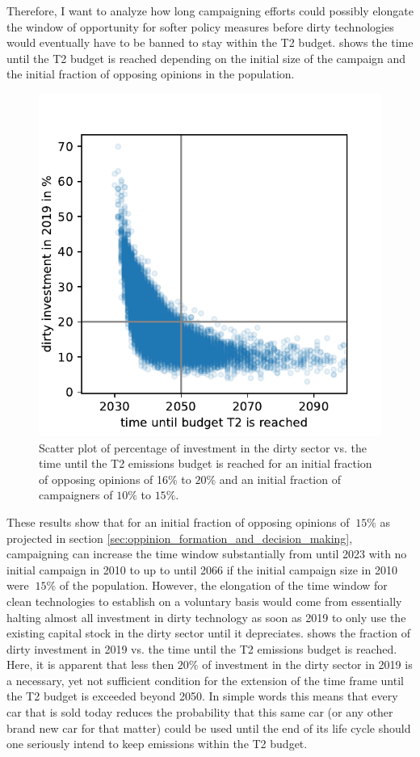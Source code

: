 Therefore, I want to analyze how long campaigning efforts could possibly elongate the window of opportunity for softer policy measures before dirty technologies would eventually have to be banned to stay within the T2 budget.  shows the time until the T2 budget is reached depending on the initial size of the campaign and the initial fraction of opposing opinions in the population. 
\begin{figure}
	\vspace{-.4 cm}
        \hspace{-1.4 cm}
        \includegraphics[width = .57 \textwidth]{./figures/dirty_investment_consequences.pdf}
        \caption{Scatter plot of percentage of investment in the dirty sector vs. the time until the T2 emissions budget is reached for an initial fraction of opposing opinions of 16\% to $20\%$ and an initial fraction of campaigners of $10\%$ to $15\%$. \label{fig:dirty_investment_consequences}}
\end{figure}
These results show that for an initial fraction of opposing opinions of $~15\%$ as projected in section \ref{sec:oppinion_formation_and_decision_making}, campaigning can increase the time window substantially from until 2023 with no initial campaign in 2010 to up to until 2066 if the initial campaign size in 2010 were $~15\%$ of the population. 
However, the elongation of the time window for clean technologies to establish on a voluntary basis would come from essentially halting almost all investment in dirty technology as soon as 2019 to only use the existing capital stock in the dirty sector until it depreciates.  shows the fraction of dirty investment in 2019 vs. the time until the T2 emissions budget is reached. 
Here, it is apparent that less then $20\%$ of investment in the dirty sector in 2019 is a necessary, yet not sufficient condition for the extension of the time frame until the T2 budget is exceeded beyond 2050. In simple words this means that every car that is sold today reduces the probability that this same car (or any other brand new car for that matter) could be used until the end of its life cycle should one seriously intend to keep emissions within the T2 budget.

